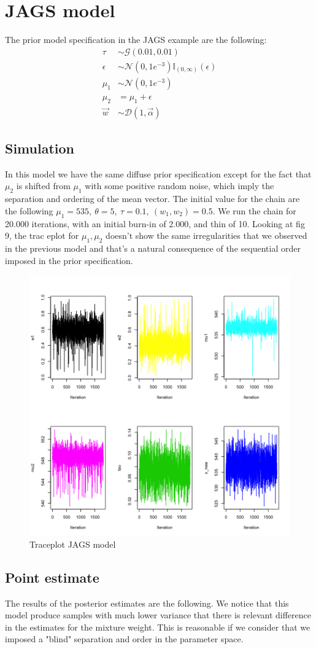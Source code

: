 \documentclass{article}
\begin{document}
\section{JAGS model}
The prior model specification in the JAGS example are the following:
\begin{align*}
\tau &\sim \mathcal{G}(0.01, 0.01) \\
\epsilon &\sim \mathcal{N}(0, 1e^{-3}) \mathbb{I}_{(0, \infty)}(\epsilon) \\ 
\mu_1 &\sim \mathcal{N}(0, 1e^{-3}) \\
\mu_2 &= \mu_1 + \epsilon \\
\vec w &\sim \mathcal{D}(1, \vec \alpha)
\end{align*}

\subsection{Simulation}
In this model we have the same diffuse prior specification except for the fact that $\mu_2$ is shifted from $\mu_1$ with some positive random noise, which imply the separation and ordering of the mean vector. The initial value for the chain are the following $\mu_1 = 535, \ \theta = 5, \ \tau = 0.1,\ (w_1, w_2) = 0.5$. We run the chain for 20.000 iterations, with an initial burn-in of 2.000, and thin of 10. Looking at fig 9, the trac eplot for $\mu_1, \mu_2$ doesn't show the same irregularities that we observed in the previous model and that's a natural consequence of the sequential order imposed in the prior specification. 

\begin{figure}[h!]
    \centering
    \includegraphics[width=.5\textwidth]{plot_9.png}
    \caption{Traceplot JAGS model}
    \label{Monkey measurement}
\end{figure}

\subsection{Point estimate}
The results of the posterior estimates are the following. We notice that this model produce samples with much lower variance that there is relevant difference in the estimates for the mixture weight. This is reasonable if we consider that we imposed a "blind" separation and order in the parameter space.
\end{document}
